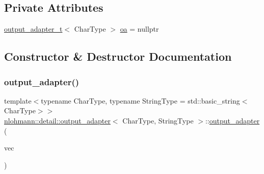 \subsection*{Private Attributes}
\begin{DoxyCompactItemize}
\item 
\hyperlink{namespacenlohmann_1_1detail_a9b680ddfb58f27eb53a67229447fc556}{output\+\_\+adapter\+\_\+t}$<$ Char\+Type $>$ \hyperlink{classnlohmann_1_1detail_1_1output__adapter_a323c18d74d6680faafec6dc3ace825e2}{oa} = nullptr
\end{DoxyCompactItemize}


\subsection{Constructor \& Destructor Documentation}
\mbox{\label{classnlohmann_1_1detail_1_1output__adapter_a05a30a77b568fd84676078d938cbd484}} 
\subsubsection{\texorpdfstring{output\+\_\+adapter()}{output\_adapter()}\hspace{0.1cm}{\footnotesize\ttfamily [1/3]}}
{\footnotesize\ttfamily template$<$typename Char\+Type, typename String\+Type = std\+::basic\+\_\+string$<$\+Char\+Type$>$$>$ \\
\hyperlink{classnlohmann_1_1detail_1_1output__adapter}{nlohmann\+::detail\+::output\+\_\+adapter}$<$ Char\+Type, String\+Type $>$\+::\hyperlink{classnlohmann_1_1detail_1_1output__adapter}{output\+\_\+adapter} (\begin{DoxyParamCaption}\item[{std\+::vector$<$ Char\+Type $>$ \&}]{vec }\end{DoxyParamCaption})\hspace{0.3cm}{\ttfamily [inline]}}

\mbox{\label{classnlohmann_1_1detail_1_1output__adapter_a43b3ba852e6a2c3f4d312543bb04c00d}} 
